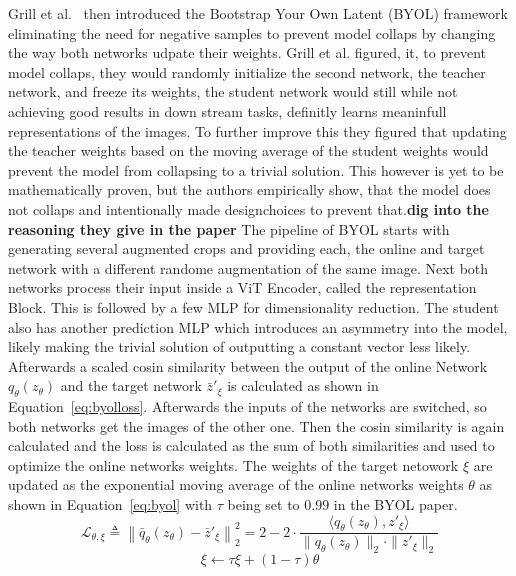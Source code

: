 Grill et al.~\cite{Grill2020} then introduced the Bootstrap Your Own Latent (BYOL) framework eliminating the need for negative samples to prevent model collaps by changing the way both networks udpate their weights. 
Grill et al. figured, it, to prevent model collaps, they would randomly initialize the second network, the teacher network, and freeze its weights, the student network would still while not achieving good results in down stream tasks, definitly learns meaninfull representations of the images.
To further improve this they figured that updating the teacher weights based on the moving average of the student weights would prevent the model from collapsing to a trivial solution.
This however is yet to be mathematically proven, but the authors empirically show, that the model does not collaps and intentionally made designchoices to prevent that.\textbf{dig into the reasoning they give in the paper}
The pipeline of BYOL starts with generating several augmented crops and providing each, the online and target network with a different randome augmentation of the same image.
Next both networks process their input inside a ViT Encoder, called the representation Block. 
This is followed by a few MLP for dimensionality reduction. 
The student also has another prediction MLP which introduces an asymmetry into the model, likely making the trivial solution of outputting a constant vector less likely.
Afterwards a scaled cosin similarity between the output of the online Network $q_{\theta}(z_{\theta})$ and the target network $\bar{z}'_{\xi}$ is calculated as shown in Equation~\ref{eq:byolloss}.
Afterwards the inputs of the networks are switched, so both networks get the images of the other one.
Then the cosin similarity is again calculated and the loss is calculated as the sum of both similarities and used to optimize the online networks weights.
The weights of the target netowork $\xi$ are updated as the exponential moving average of the online networks weights $\theta$ as shown in Equation~\ref{eq:byol} with $\tau$ being set to $0.99$ in the BYOL paper.
\begin{equation}
    \mathcal{L}_{\theta, \xi} \triangleq \left\| \bar{q}_{\theta}(z_{\theta}) - \bar{z}'_{\xi} \right\|_2^2 = 2 - 2 \cdot \frac{\langle q_{\theta}(z_{\theta}), z'_{\xi} \rangle}{\| q_{\theta}(z_{\theta}) \|_2 \cdot \| z'_{\xi} \|_2}\label{eq:byolloss}
\end{equation}
\begin{equation}
    \xi \leftarrow \tau \xi + (1-\tau) \theta
    \label{eq:byol}
\end{equation}

